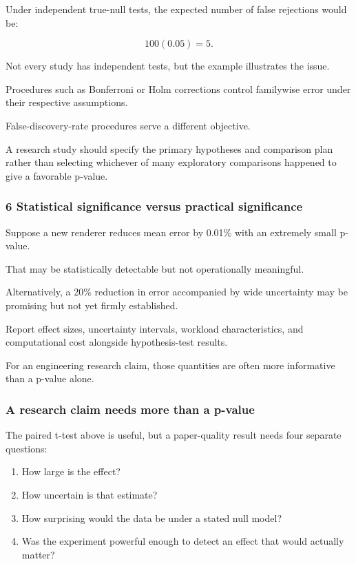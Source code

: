 Under independent true-null tests, the expected number of false rejections would be:

\[
 100(0.05)=5.
\]

Not every study has independent tests, but the example illustrates the issue.

Procedures such as Bonferroni or Holm corrections control familywise error under their respective assumptions.

False-discovery-rate procedures serve a different objective.

A research study should specify the primary hypotheses and comparison plan rather than selecting whichever of many exploratory comparisons happened to give a favorable p-value.

\subsubsection{6 Statistical significance versus practical significance}\label{02-foundations-ii-ch030-statistical-significance-versus-practical-significance}

\hypertarget{02-foundations-ii-ch030-statistical-significance-versus-practical-significance}{}

Suppose a new renderer reduces mean error by 0.01\% with an extremely small p-value.

That may be statistically detectable but not operationally meaningful.

Alternatively, a 20\% reduction in error accompanied by wide uncertainty may be promising but not yet firmly established.

Report effect sizes, uncertainty intervals, workload characteristics, and computational cost alongside hypothesis-test results.

For an engineering research claim, those quantities are often more informative than a p-value alone.

\subsubsection{A research claim needs more than a p-value}\label{02-foundations-ii-ch030-a-research-claim-needs-more-than-a-p-value}

\hypertarget{02-foundations-ii-ch030-a-research-claim-needs-more-than-a-p-value}{}

The paired t-test above is useful, but a paper-quality result needs four separate questions:

\begin{enumerate}
\def\labelenumi{\arabic{enumi}.}
\tightlist
\item
  How large is the effect?
\item
  How uncertain is that estimate?
\item
  How surprising would the data be under a stated null model?
\item
  Was the experiment powerful enough to detect an effect that would actually matter?
\end{enumerate}

